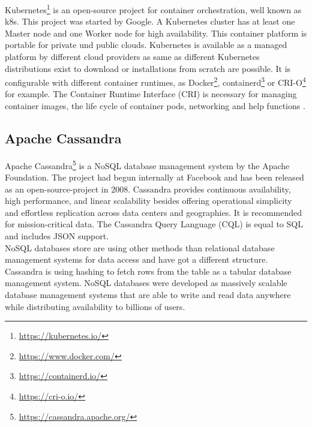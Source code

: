 Kubernetes\footnote{\url{https://kubernetes.io/}} is an open-source project for container orchestration, well known as k8s. This project was started by Google. A Kubernetes cluster has at least one Master node and one Worker node for high availability. This container platform is portable for private und public clouds. Kubernetes is available as a managed platform by different cloud providers as same as different Kubernetes distributions exist to download or installations from scratch are possible. It is configurable with different container runtimes, as Docker\footnote{\url{https://www.docker.com/}}, containerd\footnote{\url{https://containerd.io/}} or CRI-O\footnote{\url{https://cri-o.io/}} for example. The Container Runtime Interface (CRI) is necessary for managing container images, the life cycle of container pods, networking and help functions \cite[~p.16]{Scholl2019}. 


\subsection{Apache Cassandra}

Apache Cassandra\footnote{\url{https://cassandra.apache.org/}} is a NoSQL database management system by the Apache Foundation. The project had begun internally at Facebook and has been released as an open-source-project in 2008. Cassandra provides continuous availability, high performance, and linear scalability besides  offering operational simplicity and effortless replication across data centers and geographies\cite{Datastax}. It is recommended for mission-critical data. The Cassandra Query Language (CQL) is equal to SQL and includes JSON support. \\
NoSQL databases store are using other methods than relational database management systems for data access and have got a different structure. Cassandra is using hashing to fetch rows from the table as a tabular database management system. 
NoSQL databases were developed as massively scalable database management systems that are able to write and read data anywhere while distributing availability to billions of users.